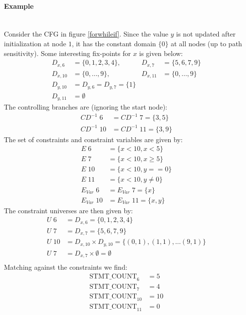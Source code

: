 \documentclass[a4paper]{article}
\newcommand{\NL}[0]{ \hfill\\\noindent }
\begin{document}
\paragraph{Example}\NL
Consider the CFG in figure \ref{forwhileif}. Since the value $y$ is not updated after initialization at node $1$, it has the constant domain $\{0\}$ at all nodes (up to path sensitivity). Some interesting fix-points for $x$ is given below:
\begin{align*}
D_{x,6}  &= \{0,1,2,3,4\},    &D_{x,7}  &= \{5,6,7,9\}\\
D_{x,10} &= \{0, \ldots, 9\}, &D_{x,11} &= \{0, \ldots, 9\} \\
D_{y,10} &= D_{y,6} = D_{y,7} = \{1\}\\
D_{y,11} &= \emptyset 
\end{align*}
\noindent
The controlling branches are (ignoring the start node):
\begin{align*}
CD^{-1}\;6  &= CD^{-1}\;7  = \{3,5\} \\
CD^{-1}\;10 &= CD^{-1}\;11 = \{3, 9\}
\end{align*}
\noindent
The set of constraints and constraint variables are given by:
\begin{align*}
E\;6  &= \{x < 10, x < 5\}\\
E\;7  &= \{x < 10, x \geq 5\}\\
E\;10 &= \{x < 10, y == 0\}\\
E\;11 &= \{x < 10, y \neq 0\}\\
E_{Var}\;6  &= E_{Var}\;7  = \{x\}\\
E_{Var}\;10 &= E_{Var}\;11 = \{x, y\}
\end{align*}
\noindent
The constraint universes are then given by:
\begin{align*}
U\;6  &= D_{x,6} = \{0,1,2,3,4\}\\
U\;7  &= D_{x,7} = \{5,6,7,9\}\\
U\;10  &= D_{x,10} \times D_{y,10} = \{(0,1),(1,1), \ldots (9,1)\}\\
U\;7  &= D_{x,7} \times \emptyset = \emptyset\\
\end{align*}
\noindent
Matching against the constraints we find:
\begin{align*}
\text{STMT\_COUNT}_6    &= 5\\
\text{STMT\_COUNT}_7    &= 4\\
\text{STMT\_COUNT}_{10} &= 10\\
\text{STMT\_COUNT}_{11} &= 0
\end{align*}
\end{document}
